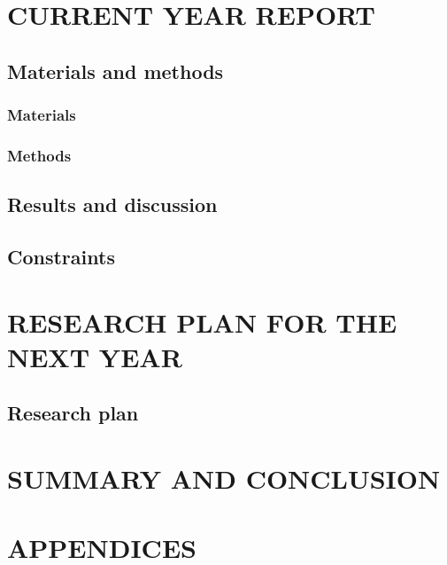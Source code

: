 \documentclass[12pt,a4paper]{report}
\begin{document}
\chapter{CURRENT YEAR REPORT}

\section{Materials and methods}

\subsection{Materials}

\subsection{Methods}

\section{Results and discussion}

\section{Constraints}

\chapter{RESEARCH PLAN FOR THE NEXT YEAR}

\section{Research plan}

\chapter{SUMMARY AND CONCLUSION}

\printbibliography[heading=bibintoc,title={REFERENCES}]

\appendix
\chapter*{APPENDICES}

\signatureblock
\end{document}
